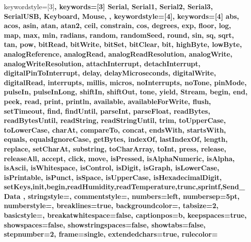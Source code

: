 {  keywordstyle=[3]\bfseries\color{arduinoOrange},
  keywords=[3]{  %
                Serial, Serial1, Serial2, Serial3, SerialUSB, Keyboard, Mouse,
                },      
%
%
  keywordstyle=[4]\color{arduinoOrange},
  keywords=[4]{  %
                abs, acos, asin, atan, atan2, ceil, constrain, cos, degrees, exp, 
                floor, log, map, max, min, radians, random, randomSeed, round, sin, 
                sq, sqrt, tan, pow, bitRead, bitWrite, bitSet, bitClear, bit, 
                highByte, lowByte, analogReference, analogRead, 
                analogReadResolution, analogWrite, analogWriteResolution, 
                attachInterrupt, detachInterrupt, digitalPinToInterrupt, delay, 
                delayMicroseconds, digitalWrite, digitalRead, interrupts, millis, 
                micros, noInterrupts, noTone, pinMode, pulseIn, pulseInLong, shiftIn, 
                shiftOut, tone, yield, Stream, begin, end, peek, read, print, 
                println, available, availableForWrite, flush, setTimeout, find, 
                findUntil, parseInt, parseFloat, readBytes, readBytesUntil, readString, 
                readStringUntil, trim, toUpperCase, toLowerCase, charAt, compareTo, 
                concat, endsWith, startsWith, equals, equalsIgnoreCase, getBytes, 
                indexOf, lastIndexOf, length, replace, setCharAt, substring, 
                toCharArray, toInt, press, release, releaseAll, accept, click, move, 
                isPressed, isAlphaNumeric, isAlpha, isAscii, isWhitespace, isControl, 
                isDigit, isGraph, isLowerCase, isPrintable, isPunct, isSpace, 
                isUpperCase, isHexadecimalDigit,
                setKeys,init,begin,readHumidity,readTemperature,trunc,sprintf,Send_Data
                },      
%
%
  stringstyle=\color{arduinoDarkBlue},    
  commentstyle=\color{arduinoGrey},    
%          
%   
  numbers=left,                    
  numbersep=5pt,                   
  numberstyle=\color{arduinoGrey},    
%
%
  breaklines=true,                    %
  backgroundcolor=\color{bgCodeColor},
  tabsize=2,
  basicstyle=\ttfamily\footnotesize,
  breakatwhitespace=false,         
  captionpos=b,                    
  keepspaces=true,                  
  showspaces=false,                
  showstringspaces=false,
  showtabs=false,
  stepnumber=2,
  frame=single,
  extendedchars=true,
  rulecolor=\color{black}
}